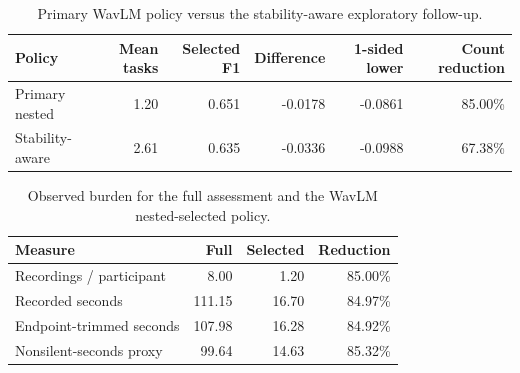\begin{table}[t]
\centering
\caption{Primary WavLM policy versus the stability-aware exploratory follow-up.}
\label{tab:wavlmpolicies}
\small
\begin{tabular}{lrrrrr}
\toprule
Policy & Mean tasks & Selected F1 & Difference & 1-sided lower & Count reduction \\
\midrule
Primary nested & 1.20 & 0.651 & -0.0178 & -0.0861 & 85.00\% \\
Stability-aware & 2.61 & 0.635 & -0.0336 & -0.0988 & 67.38\% \\
\bottomrule
\end{tabular}
\end{table}

\begin{table}[t]
\centering
\caption{Observed burden for the full assessment and the WavLM nested-selected policy.}
\label{tab:burden}
\small
\begin{tabular}{lrrr}
\toprule
Measure & Full & Selected & Reduction \\
\midrule
Recordings / participant & 8.00 & 1.20 & 85.00\% \\
Recorded seconds & 111.15 & 16.70 & 84.97\% \\
Endpoint-trimmed seconds & 107.98 & 16.28 & 84.92\% \\
Nonsilent-seconds proxy & 99.64 & 14.63 & 85.32\% \\
\bottomrule
\end{tabular}
\end{table}
